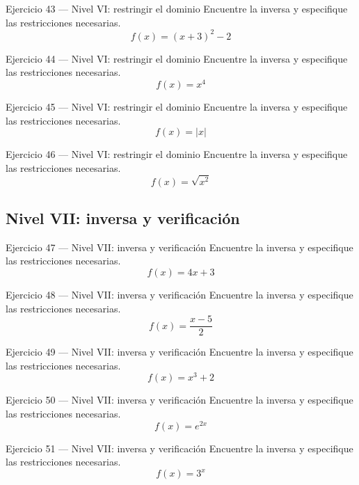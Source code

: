 \documentclass[aspectratio=169,10pt]{beamer}
\begin{document}
\begin{frame}{Ejercicio 43 — Nivel VI: restringir el dominio}
Encuentre la inversa y especifique las restricciones necesarias.
\[
f(x)=(x+3)^2-2
\]
\end{frame}

\begin{frame}{Ejercicio 44 — Nivel VI: restringir el dominio}
Encuentre la inversa y especifique las restricciones necesarias.
\[
f(x)=x^4
\]
\end{frame}

\begin{frame}{Ejercicio 45 — Nivel VI: restringir el dominio}
Encuentre la inversa y especifique las restricciones necesarias.
\[
f(x)=|x|
\]
\end{frame}

\begin{frame}{Ejercicio 46 — Nivel VI: restringir el dominio}
Encuentre la inversa y especifique las restricciones necesarias.
\[
f(x)=\sqrt{x^2}
\]
\end{frame}

\subsection{Nivel VII: inversa y verificación}
\begin{frame}{Ejercicio 47 — Nivel VII: inversa y verificación}
Encuentre la inversa y especifique las restricciones necesarias.
\[
f(x)=4x+3
\]
\end{frame}

\begin{frame}{Ejercicio 48 — Nivel VII: inversa y verificación}
Encuentre la inversa y especifique las restricciones necesarias.
\[
f(x)=\frac{x-5}{2}
\]
\end{frame}

\begin{frame}{Ejercicio 49 — Nivel VII: inversa y verificación}
Encuentre la inversa y especifique las restricciones necesarias.
\[
f(x)=x^3+2
\]
\end{frame}

\begin{frame}{Ejercicio 50 — Nivel VII: inversa y verificación}
Encuentre la inversa y especifique las restricciones necesarias.
\[
f(x)=e^{2x}
\]
\end{frame}

\begin{frame}{Ejercicio 51 — Nivel VII: inversa y verificación}
Encuentre la inversa y especifique las restricciones necesarias.
\[
f(x)=3^x
\]
\end{frame}
\end{document}
